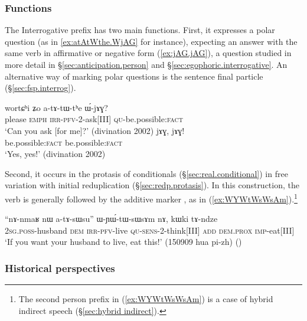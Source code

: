  \subsubsection{Functions} \label{sec:interrogative.W.function}
The Interrogative prefix  has two main functions.  First, it expresses a polar question (as in \ref{ex:atAtWthe.WjAG} for instance), expecting an answer with the same verb in affirmative or negative form (\ref{ex:jAG.jAG}), a question studied in more detail in §\ref{sec:anticipation.person} and §\ref{sec:egophoric.interrogative}. An alternative way of marking polar questions is the sentence final particle  (§\ref{sec:fsp.interrog}).


\begin{exe}
\ex 
\begin{xlist}
\ex \label{ex:atAtWthe.WjAG}
 \gll wortɕʰi ʑo a-tɤ-tɯ-tʰe ɯ́-jɤɣ? \\
please \textsc{emph} \textsc{irr}-\textsc{pfv}-2-ask[III] \textsc{qu}-be.possible:\textsc{fact} \\ 
\glt `Can you ask [for me]?' (divination 2002)
\ex \label{ex:jAG.jAG}
 \gll jɤɣ, jɤɣ! \\
be.possible:\textsc{fact} be.possible:\textsc{fact} \\ 
\glt `Yes, yes!' (divination 2002)
\end{xlist}
\end{exe}

Second, it occurs in the protasis of conditionals (§\ref{sec:real.conditional}) in free variation with initial reduplication (§\ref{sec:redp.protasis}). In this construction, the verb is generally followed by the additive marker , as in (\ref{ex:WYWtWsWsAm}).\footnote{The second person prefix  in (\ref{ex:WYWtWsWsAm}) is a case of hybrid indirect speech (§\ref{sec:hybrid indirect}). }
 
\begin{exe}
\ex \label{ex:WYWtWsWsAm}
 \gll ``nɤ-nmaʁ nɯ a-tɤ-sɯsu'' ɯ-ɲɯ́-tɯ-sɯsɤm nɤ, kɯki tɤ-ndze \\
 \textsc{2sg}.\textsc{poss}-husband \textsc{dem} \textsc{irr}-\textsc{pfv}-live \textsc{qu}-\textsc{sens}-2-think[III] \textsc{add} \textsc{dem}.\textsc{prox} \textsc{imp}-eat[III] \\
\glt `If you want your husband to live, eat this!' (150909 hua pi-zh) ()
\end{exe}

\subsubsection{Historical perspectives} \label{sec:interrogative.e.history}

